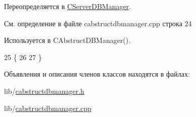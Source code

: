 Переопределяется в \hyperlink{class_c_server_d_b_manager_a6dcd2f88c0845cc79a47bac2ab9e9235}{C\+Server\+D\+B\+Manager}.



См. определение в файле cabstructdbmanager.\+cpp строка 24



Используется в C\+Abstruct\+D\+B\+Manager().


\begin{DoxyCode}
25 \{
26 
27 \}
\end{DoxyCode}


Объявления и описания членов классов находятся в файлах\+:\begin{DoxyCompactItemize}
\item 
lib/\hyperlink{cabstructdbmanager_8h}{cabstructdbmanager.\+h}\item 
lib/\hyperlink{cabstructdbmanager_8cpp}{cabstructdbmanager.\+cpp}\end{DoxyCompactItemize}
